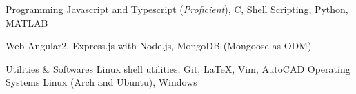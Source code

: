 \begin{cvskills}

  \cvskill
  {Programming}
		{Javascript and Typescript (\textit{Proficient}), C, Shell Scripting, Python, MATLAB}

  \cvskill
  {Web}
		{Angular2, Express.js with Node.js, MongoDB (Mongoose as ODM) }

  \cvskill
		{Utilities \& Softwares}
  {Linux shell utilities, Git, \LaTeX, Vim, AutoCAD}
		\cvskill
		{Operating Systems}
		{Linux (Arch and Ubuntu), Windows}
\end{cvskills}

